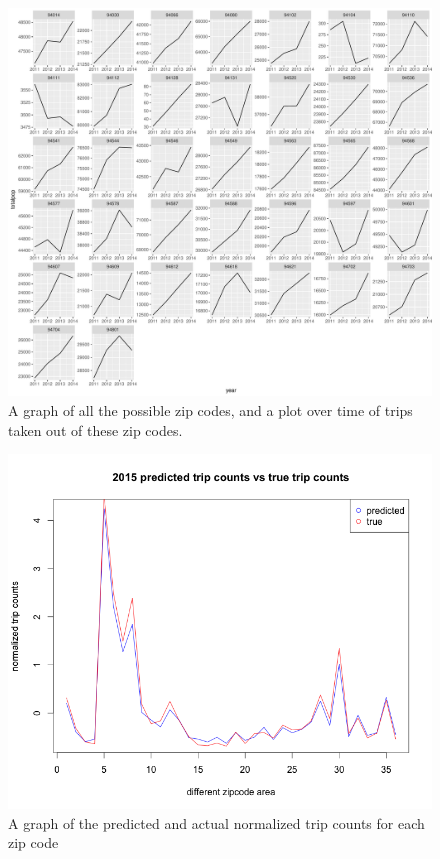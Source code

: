 \documentclass[12pt,twoside]{article}
\begin{document}
\begin{figure} \label{figure5} 
\centerline{\includegraphics[scale=0.6]{Rplot05.pdf}}
\caption{A graph of all the possible zip codes, and a plot over time of trips taken out of these zip codes.  }
\end{figure} 
\begin{figure} \label{figure6} 
\centerline{\includegraphics[scale=0.6]{predicted2015.png}}
\caption{A graph of the predicted and actual normalized trip counts for each zip code }
\end{figure} 
\end{document}

